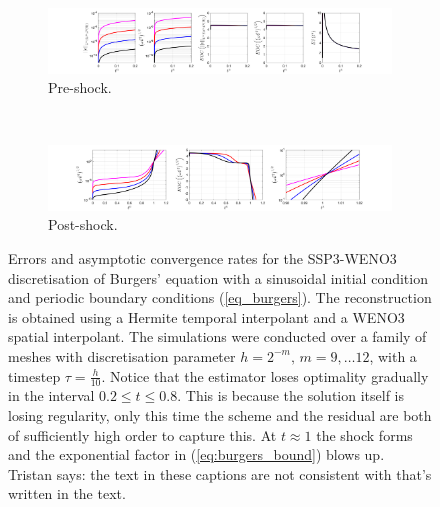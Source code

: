 \documentclass[final]{amsart}
\newcommand{\tristan}[1]{{\color{purple} Tristan says:  #1 }}
\numberwithin{equation}{section}
\begin{document}
\begin{figure}[H]
	\begin{subfigure}[b]{\textwidth}
		\includegraphics[width=\textwidth]{../figures/fig_SSP3WENO3_prehockplots_1x5_sin_IC_P3_burgers}	
		\caption{
			\label{fig:SSP3WENO3_burgers_P3_preshock}
			Pre-shock.
		}
	\end{subfigure}
	\\
	\begin{subfigure}[b]{\textwidth}
		\includegraphics[width=\textwidth]{../figures/fig_SSP3WENO3_postshockplots_1x5_sin_IC_P3_burgers}	
		\caption{\label{fig:SSP3WENO3_burgers_P3_postshock}
			Post-shock. 
		}
	\end{subfigure}
	\caption{\label{fig:SSP3WENO_burgers} Errors and asymptotic
          convergence rates for the SSP3-WENO3 discretisation of
          Burgers' equation with a sinusoidal initial condition and
          periodic boundary conditions (\ref{eq_burgers}).  The
          reconstruction is obtained using a Hermite temporal
          interpolant and a WENO3 spatial interpolant.  The
          simulations were conducted over a family of meshes with
          discretisation parameter $h = 2^{-m}, \,m = 9,\dots 12$,
          with a timestep $\tau = \tfrac{h}{10}$.  Notice that the
          estimator loses optimality gradually in the interval
          $0.2\leq t \leq 0.8$.  This is because the solution itself
          is losing regularity, only this time the scheme and the
          residual are both of sufficiently high order to capture
          this.  At $t\approx 1$ the shock forms and the exponential
          factor in (\ref{eq:burgers_bound}) blows up.  \tristan{the
            text in these captions are not consistent with that's
            written in the text.} }
\end{figure}
\end{document}
